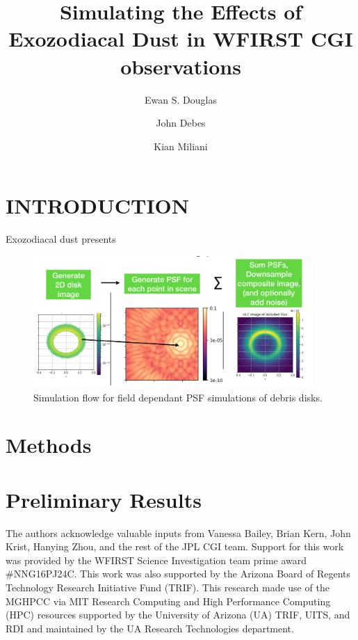\documentclass[]{spie}  %
\title{Simulating the Effects of Exozodiacal Dust in WFIRST CGI observations}
\author[a]{Ewan S. Douglas}
\author[b]{John Debes}
\author[a]{Kian Miliani}
\affil[a]{University of Arizona, Tucson, AZ, USA}
\affil[b]{STScI, Baltimore, MD, USA}
\begin{document}
 
\maketitle

\begin{abstract}

\end{abstract}


\section{INTRODUCTION}
\label{sec:intro}  %
Exozodiacal dust presents 
\begin{figure}
    \centering
    \includegraphics[width=0.95\textwidth]{flow.png}
    \caption{Simulation flow for field dependant PSF simulations of debris disks.}
    \label{fig:my_label}
\end{figure}
\section{Methods}



\section{Preliminary Results}

    
\acknowledgments %
The authors acknowledge valuable inputs from  Vanessa Bailey,  Brian Kern, John Krist, Hanying Zhou,   and the rest of the JPL CGI team.
 Support for this work was provided by the WFIRST Science Investigation team prime award \#NNG16PJ24C.
This work was also supported by the Arizona Board of Regents Technology Research
Initiative Fund (TRIF).
This research made use of the \gls{MGHPCC} via MIT Research Computing and High Performance Computing (HPC) resources supported by the University of Arizona (UA) TRIF, UITS, and RDI and maintained by the UA Research Technologies department.

\end{document}
